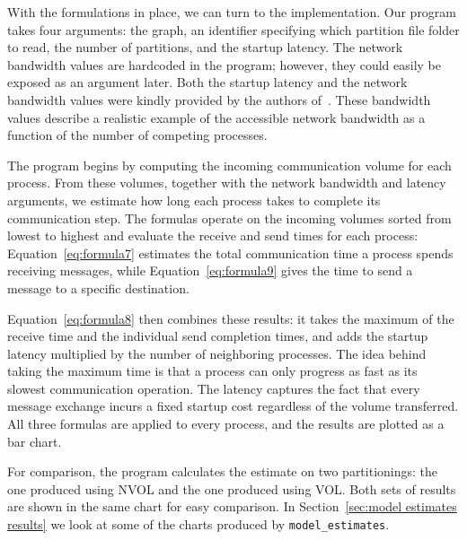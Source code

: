 With the formulations in place, we can turn to the implementation. Our program takes four arguments: the graph, an identifier specifying which partition file folder to read, the number of partitions, and the startup latency. The network bandwidth values are hardcoded in the program; however, they could easily be exposed as an argument later. Both the startup latency and the network bandwidth values were kindly provided by the authors of~\cite{Xing_of_Heterogeneous}. These bandwidth values describe a realistic example of the accessible network bandwidth as a function of the number of competing processes.

The program begins by computing the incoming communication volume for each process. From these volumes, together with the network bandwidth and latency arguments, we estimate how long each process takes to complete its communication step. The formulas operate on the incoming volumes sorted from lowest to highest and evaluate the receive and send times for each process: Equation~\ref{eq:formula7} estimates the total communication time a process spends receiving messages, while Equation~\ref{eq:formula9} gives the time to send a message to a specific destination.

Equation~\ref{eq:formula8} then combines these results: it takes the maximum of the receive time and the individual send completion times, and adds the startup latency multiplied by the number of neighboring processes. The idea behind taking the maximum time is that a process can only progress as fast as its slowest communication operation. The latency captures the fact that every message exchange incurs a fixed startup cost regardless of the volume transferred. All three formulas are applied to every process, and the results are plotted as a bar chart.

For comparison, the program calculates the estimate on two partitionings: the one produced using NVOL and the one produced using VOL. Both sets of results are shown in the same chart for easy comparison. In Section~\ref{sec:model estimates results} we look at some of the charts produced by \texttt{model\_estimates}.